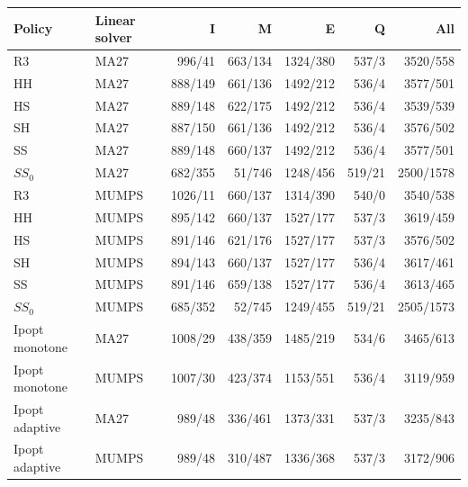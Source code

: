 \begin{tabular}{@{}llrrrrr@{}}
\toprule
Policy & Linear solver & I & M & E & Q & All \\
\midrule
R3 & MA27 & 996/41 & 663/134 & 1324/380 & 537/3 & 3520/558 \\
HH & MA27 & 888/149 & 661/136 & 1492/212 & 536/4 & 3577/501 \\
HS & MA27 & 889/148 & 622/175 & 1492/212 & 536/4 & 3539/539 \\
SH & MA27 & 887/150 & 661/136 & 1492/212 & 536/4 & 3576/502 \\
SS & MA27 & 889/148 & 660/137 & 1492/212 & 536/4 & 3577/501 \\
$SS_0$ & MA27 & 682/355 & 51/746 & 1248/456 & 519/21 & 2500/1578 \\
R3 & MUMPS & 1026/11 & 660/137 & 1314/390 & 540/0 & 3540/538 \\
HH & MUMPS & 895/142 & 660/137 & 1527/177 & 537/3 & 3619/459 \\
HS & MUMPS & 891/146 & 621/176 & 1527/177 & 537/3 & 3576/502 \\
SH & MUMPS & 894/143 & 660/137 & 1527/177 & 536/4 & 3617/461 \\
SS & MUMPS & 891/146 & 659/138 & 1527/177 & 536/4 & 3613/465 \\
$SS_0$ & MUMPS & 685/352 & 52/745 & 1249/455 & 519/21 & 2505/1573 \\
Ipopt monotone & MA27 & 1008/29 & 438/359 & 1485/219 & 534/6 & 3465/613 \\
Ipopt monotone & MUMPS & 1007/30 & 423/374 & 1153/551 & 536/4 & 3119/959 \\
Ipopt adaptive & MA27 & 989/48 & 336/461 & 1373/331 & 537/3 & 3235/843 \\
Ipopt adaptive & MUMPS & 989/48 & 310/487 & 1336/368 & 537/3 & 3172/906 \\
\bottomrule
\end{tabular}
